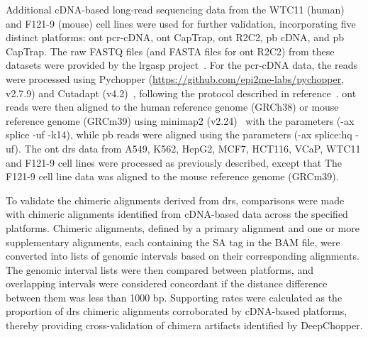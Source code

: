 \documentclass[pdflatex,sn-nature, lineno]{sn-jnl}%
\begin{document}
Additional cDNA-based long-read sequencing data from the WTC11 (human) and F121-9 (mouse) cell lines were used for further validation, incorporating five distinct platforms: \gls{ont} \gls{pcr}-cDNA, \gls{ont} CapTrap, \gls{ont} R2C2, \gls{pb} cDNA, and \gls{pb} CapTrap.
The raw FASTQ files (and FASTA files for \gls{ont} R2C2) from these datasets were provided by the \gls{lrgasp} project~\cite{pardo2024systematic}.
For the \gls{pcr}-cDNA data, the reads were processed using Pychopper (\url{https://github.com/epi2me-labs/pychopper}, v2.7.9) and Cutadapt (v4.2)~\cite{martin2011cutadapt}, following the protocol described in reference~\cite{grunberger2022nanopore}. \gls{ont} reads were then aligned to the human reference genome (GRCh38) or mouse reference genome (GRCm39) using minimap2 (v2.24)~\cite{li2018minimap2} with the parameters (-ax splice -uf -k14), while \gls{pb} reads were aligned using the parameters (-ax splice:hq -uf).
The \gls{ont} \gls{drs} data from A549, K562, HepG2, MCF7, HCT116, VCaP, WTC11 and F121-9 cell lines were processed as previously described, except that The F121-9 cell line data was aligned to the mouse reference genome (GRCm39).

To validate the chimeric alignments derived from \gls{drs}, comparisons were made with chimeric alignments identified from cDNA-based data across the specified platforms.
Chimeric alignments, defined by a primary alignment and one or more supplementary alignments, each containing the SA tag in the BAM file, were converted into lists of genomic intervals based on their corresponding alignments.
The genomic interval lists were then compared between platforms, and overlapping intervals were considered concordant if the distance difference between them was less than 1000 bp.
Supporting rates were calculated as the proportion of \gls{drs} chimeric alignments corroborated by cDNA-based platforms, thereby providing cross-validation of chimera artifacts identified by DeepChopper.

\end{document}
